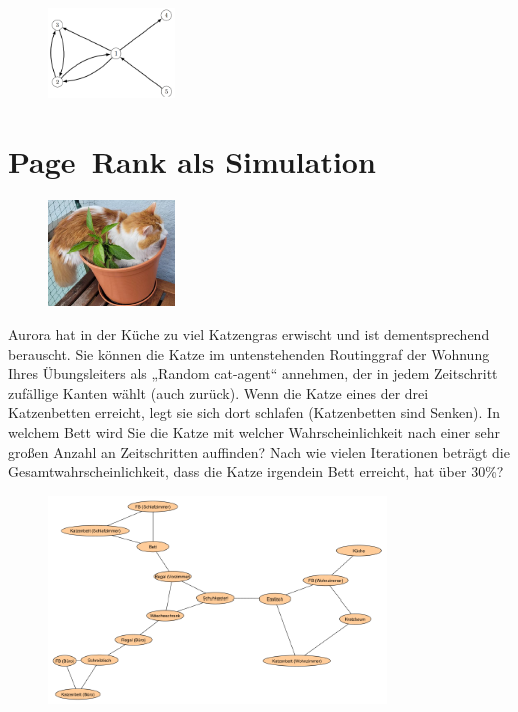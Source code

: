 \documentclass[a4paper,11pt]{report}
\begin{document}
    \begin{figure}[H]
        \includegraphics[width=0.3\textwidth]{a06a_graph}
        \label{fig:a06_graph}
    \end{figure}

    \newpage

    \chapter[Page Rank als Simulation]{Page~Rank als Simulation}
    \label{ch:pageRankSim}

    \begin{figure}
        \centering
        \includegraphics[width=0.3\textwidth]{a07a_cat}
        \label{fig:a06_cat}
    \end{figure}

    Aurora hat in der Küche zu viel Katzengras erwischt und ist dementsprechend berauscht.
    Sie können die Katze im untenstehenden Routinggraf der Wohnung Ihres Übungsleiters als „Random cat-agent“ annehmen,
    der in jedem Zeitschritt zufällige Kanten wählt (auch zurück).
    Wenn die Katze eines der drei Katzenbetten erreicht, legt sie sich dort schlafen (Katzenbetten sind Senken).
    In welchem Bett wird Sie die Katze mit welcher Wahrscheinlichkeit nach einer sehr großen Anzahl an Zeitschritten auffinden?
    Nach wie vielen Iterationen beträgt die Gesamtwahrscheinlichkeit, dass die Katze irgendein Bett erreicht, hat über 30\%?

    \begin{figure}[h]
        \centering
        \includegraphics[width=0.8\textwidth]{a07a_graph}
        \label{fig:a07_graph}
    \end{figure}
\end{document}
